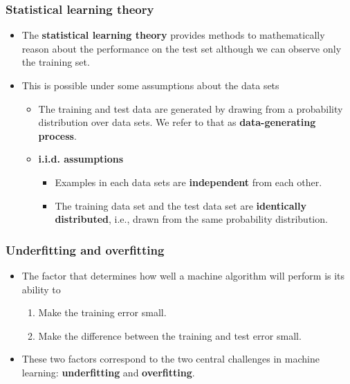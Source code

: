 \documentclass[notes]{beamer}          %
\newif\iffull
\begin{document}
\begin{frame}
\frametitle{Statistical learning theory}
    \begin{itemize}
        \item The {\bf statistical learning theory} provides methods to mathematically reason about the performance on the test set although we can observe only the training set.
        \item This is possible under some assumptions about the data sets
            \begin{itemize}
                \item The training and test data are generated by drawing from a probability distribution over data sets. We refer to that as {\bf data-generating process}.
                \item {\bf i.i.d. assumptions}
                    \begin{itemize}
                        \item Examples in each data sets are {\bf independent} from each other.
                        \item The training data set and the test data set are {\bf identically distributed}, i.e., drawn from the same probability distribution.
                    \end{itemize}
            \end{itemize}

    \end{itemize}
\end{frame}


\begin{frame}
\frametitle{Underfitting and overfitting}
    \begin{itemize}
        \item The factor that determines how well a machine algorithm will perform is its ability to
            \begin{enumerate}
                \item Make the training error small.
                \item Make the difference between the training and test error small.
            \end{enumerate}
        \item These two factors correspond to the two central challenges in machine learning: {\bf underfitting} and {\bf overfitting}.
        \iffull
        \item Underfitting occurs when the model is not able to produce a sufficiently small training error.
        \item Overfitting occurs when the gap between the training and test errors is too large.
        \fi
    \end{itemize}
\end{frame}
\end{document}

